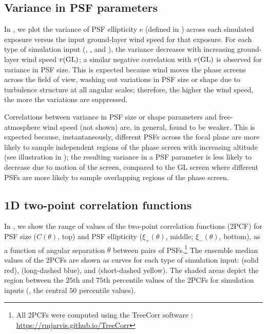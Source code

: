 \documentclass[twocolumn]{aastex631}
\begin{document}
\subsection{Variance in PSF parameters}
\label{sec:variances}

In , we plot the variance of PSF ellipticity $e$ (defined in ) across each simulated exposure versus the input ground-layer wind speed for that exposure.
For each type of simulation input (\psfwssims, \bench, and \match), the variance decreases with increasing ground-layer wind speed $v({\rm GL})$; 
a similar negative correlation with $v({\rm GL})$ is observed for variance in PSF size.  
This is expected because wind moves the  phase screens across the field of view, washing out variations in PSF size or shape due to turbulence structure at all angular scales; therefore, the higher the wind speed, the more the variations are suppressed. 

Correlations between variance in PSF size or shape parameters and free-atmosphere wind speed (not shown) are, in general, found to be weaker. 
This is expected because, instantaneously, different PSFs across the focal plane are more likely to sample independent regions of the phase screen with increasing altitude (see illustration in ); 
the resulting variance in a PSF parameter is less likely to decrease due to motion of the screen, compared to the GL screen where different PSFs are more likely to sample overlapping regions of the phase screen.  

\subsection{1D two-point correlation functions}
\label{sec:covariances}
In , we show the range of values of the two-point correlation functions (2PCF) for PSF size ($C(\theta)$, top) and PSF ellipticity ($\xi_+(\theta)$, middle; $\xi_-(\theta)$, bottom), as a function of angular separation $\theta$ between pairs of PSFs.\footnote{All 2PCFs were computed using the TreeCorr software \citep{jarvis_skewness_2004}: \url{https://rmjarvis.github.io/TreeCorr}}  
The ensemble median values of the 2PCFs are shown as curves for each type of simulation input: \psfwssims (solid red), \bench (long-dashed blue), and \match (short-dashed yellow).
The shaded areas depict the region between the $25$th and $75$th percentile values of the 2PCFs for \psfwssims simulation inputs (\ie, the central $50$ percentile values).
\end{document}
